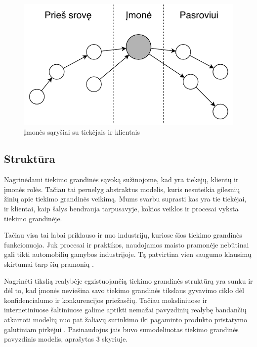 \begin{figure}[H]
    \centering
    \includegraphics[scale=0.8]{images/supply-chain-upstream-downstream}
    \caption{Įmonės sąryšiai su tiekėjais ir klientais}
\end{figure}




\subsection{Struktūra}

Nagrinėdami tiekimo grandinės sąvoką sužinojome, kad yra tiekėjų, klientų ir įmonės rolės. Tačiau tai pernelyg abstraktus modelis, kuris nesuteikia gilesnių žinių apie tiekimo grandinės veikimą. Mums svarbu suprasti kas yra tie tiekėjai, ir klientai, kaip šalys bendrauja tarpusavyje, kokios veiklos ir procesai vyksta tiekimo grandinėje. 

Tačiau visa tai labai priklauso ir nuo industrijų, kuriose šios tiekimo grandinės funkcionuoja. Juk procesai ir praktikos, naudojamos maisto pramonėje nebūtinai gali tikti automobilių gamybos industrijoje. Tą patvirtina vien saugumo klausimų skirtumai tarp šių pramonių \cite{marucheck2011product}.

Nagrinėti tikslią realybėje egzistuojančią tiekimo grandinės struktūrą yra sunku ir dėl to, kad įmonės neviešina savo tiekimo grandinės tikslaus gyvavimo ciklo dėl konfidencialumo ir konkurencijos priežasčių. Tačiau moksliniuose ir internetiniuose šaltiniuose galime aptikti nemažai pavyzdinių realybę bandančių atkartoti modelių nuo pat žaliavų surinkimo iki pagaminto produkto pristatymo galutiniam pirkėjui \cite{christopher2016logistics} \cite{webber2009building} \cite{patrick2017continuous} \cite{justin2016customer}. Pasinaudojus jais buvo sumodeliuotas tiekimo grandinės pavyzdinis modelis, aprašytas 3 skyriuje.

